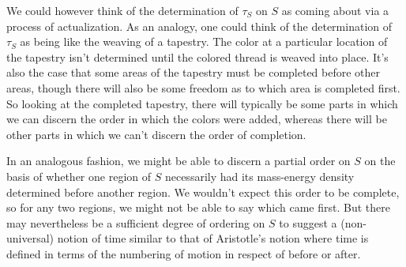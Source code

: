 \documentclass[12pt]{report}
\begin{document}
We could however think of the determination of $\tau_S$ on $S$ as coming about via a process of actualization. As an analogy, one could think of the determination of $\tau_S$ as being like the weaving of a tapestry. The color at a particular location of the tapestry isn't determined until the colored thread is weaved into place. It's also the case that some areas of the tapestry must be completed before other areas, though there will also be some freedom as to which area is completed first. So looking at the completed tapestry, there will typically be some parts in which we can discern the order in which the colors were added, whereas there will be other parts in which we can't discern the order of completion. 

In an analogous fashion, we might be able to discern a partial order on $S$ on the basis of whether one region of $S$ necessarily had its mass-energy density determined before another region. We wouldn't expect this order to be complete, so for any two regions, we might not be able to say which came first. But there may nevertheless be a sufficient degree of ordering on $S$ to suggest a (non-universal) notion of time similar to that of Aristotle's notion where time is defined in terms of the numbering of motion in respect of before or after. 
\end{document}
